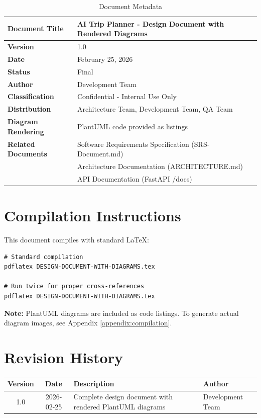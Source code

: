 \documentclass[12pt,a4paper]{report}
\begin{document}
\begin{table}[H]
\centering
\begin{tabular}{|l|p{10cm}|}
\hline
\textbf{Document Title} & AI Trip Planner - Design Document with Rendered Diagrams \\
\hline
\textbf{Version} & 1.0 \\
\hline
\textbf{Date} & February 25, 2026 \\
\hline
\textbf{Status} & Final \\
\hline
\textbf{Author} & Development Team \\
\hline
\textbf{Classification} & Confidential - Internal Use Only \\
\hline
\textbf{Distribution} & Architecture Team, Development Team, QA Team \\
\hline
\textbf{Diagram Rendering} & PlantUML code provided as listings \\
\hline
\textbf{Related Documents} & Software Requirements Specification (SRS-Document.md) \\
& Architecture Documentation (ARCHITECTURE.md) \\
& API Documentation (FastAPI /docs) \\
\hline
\end{tabular}
\caption*{Document Metadata}
\end{table}

\section*{Compilation Instructions}

This document compiles with standard LaTeX:

\begin{lstlisting}[style=bashStyle]
# Standard compilation
pdflatex DESIGN-DOCUMENT-WITH-DIAGRAMS.tex

# Run twice for proper cross-references
pdflatex DESIGN-DOCUMENT-WITH-DIAGRAMS.tex
\end{lstlisting}

\textbf{Note:} PlantUML diagrams are included as code listings. To generate actual diagram images, see Appendix \ref{appendix:compilation}.

\section*{Revision History}

\begin{table}[H]
\centering
\begin{tabular}{|c|c|p{7cm}|p{3cm}|}
\hline
\textbf{Version} & \textbf{Date} & \textbf{Description} & \textbf{Author} \\
\hline
1.0 & 2026-02-25 & Complete design document with rendered PlantUML diagrams & Development Team \\
\hline
\end{tabular}
\end{table}
\end{document}
